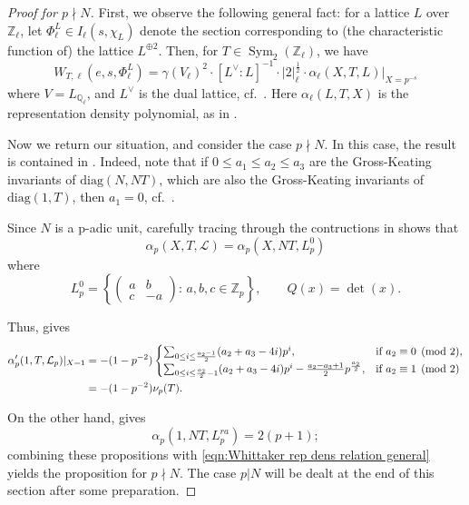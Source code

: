 \documentclass[reqno,oneside]{amsart}
\theoremstyle{plain}
\theoremstyle{remark}
\numberwithin{theorem}{section}
\newcommand{\bbQ}{\mathbb Q}
\newcommand{\bbZ}{\mathbb Z}
\newcommand{\calL}{\mathcal L}
\DeclareMathOperator{\Sym}{Sym}
\newcommand{\Z}{\mathbb{Z}}
\begin{document}
	\begin{proof}[Proof for $p \nmid N$]
		First, we observe the following general fact: for a lattice $L$ over $\mathbb Z_{\ell}$, let $\Phi_{\ell}^L \in I_{\ell}(s,\chi_{L})$ denote the section corresponding to (the characteristic function of) the lattice $L^{\oplus 2}$. Then, for $T \in \Sym_{2}(\bbZ_{\ell})$, we have
		\begin{equation} \label{eqn:Whittaker rep dens relation general}
		W_{T,\ell}(e, s, \Phi^L_{\ell}) = \gamma(V_{\ell})^2 \cdot [L^{\vee} : L]^{-1} \cdot |2|_{\ell}^{\frac12} \cdot \alpha_{\ell}(X, T, L)|_{X = p^{-s}}
		\end{equation}
		where $V =L_{\bbQ_{\ell}}$, and $L^{\vee}  $ is the dual lattice, cf.\ \cite[Lemma 5.7.1]{KRYbook}. Here $\alpha_{\ell}(L, T, X)$ is the representation density polynomial, as in \cite{YangLocal,YangLocal2}.
		
		Now we return our situation, and consider the case $p \nmid N$. In this case, the result is contained in \cite{YangLocal2}. Indeed,  note that if $0 \leq a_1 \leq a_2 \leq a_3$ are the Gross-Keating invariants of $\mathrm{diag}(N, NT)$, which are also the Gross-Keating invariants of $\mathrm{diag}(1, T)$,  then $a_1 = 0$, cf.\ \cite[Appendix B]{YangLocal2}.
		
		Since $N $ is a p-adic unit, carefully tracing through the contructions in \cite{YangLocal2} shows that
			\begin{equation}
				\alpha_{p}(X, T, \calL) = \alpha_p(X, NT, L^0_p)
			\end{equation}
		where
		$$
		L^0_p=\left\{ \begin{pmatrix}  {a}&{b} \\ {c} &{-a} \end{pmatrix}:\, a, b, c \in \Z_p\right\}, \qquad Q(x ) = \det(x).
		$$
		
		
		Thus,  \cite[Proposition 5.7]{YangLocal2} gives
		\begin{align}
		\alpha_p'(1, T, \calL_p)|_{X=1} &= -(1-p^{-2})
		\begin{cases} \sum_{0\le i \le \frac{a_2-1}2} (a_2+a_3-4i)p^i,  &\text{if }  a_2 \equiv 0 \pmod 2, \\
		\sum_{0\le i \le \frac{a_2}2-1} (a_2+a_3-4i)p^i - \frac{a_2-a_3+1}2p^{\frac{a_2}2}, &\text{if } a_2 \equiv 1 \pmod 2
		\end{cases}  \notag \\
		&= - (1-p^{-2}) \nu_p(T).
		\end{align}
		
		
		
		On the other hand, \cite[Proposition 5.7]{YangLocal2} gives
		\begin{equation} \label{eq:ram}
		\alpha_p(1, NT, L_p^{ra}) = 2 (p+1);
		\end{equation}
		combining these propositions with \eqref{eqn:Whittaker rep dens relation general} yields the proposition for $p \nmid N$.
		The case $p|N$ will be dealt at the end of this section after some preparation.
	\end{proof}
	
\end{document}
